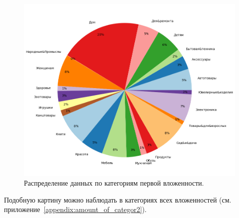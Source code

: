 \documentclass[a4paper,12pt]{extarticle}
\begin{document}
\begin{figure}[ht]
	\centering
	\includegraphics[scale=0.8]{amount_of_categoty.png}
	\caption{Распределение данных по категориям первой вложенности.}
	\label{fig:amount_of_categoty}
\end{figure}

Подобную картину можно наблюдать в категориях всех вложенностей (см. приложение~\ref{appendix:amount_of_categor2}).
\end{document}
